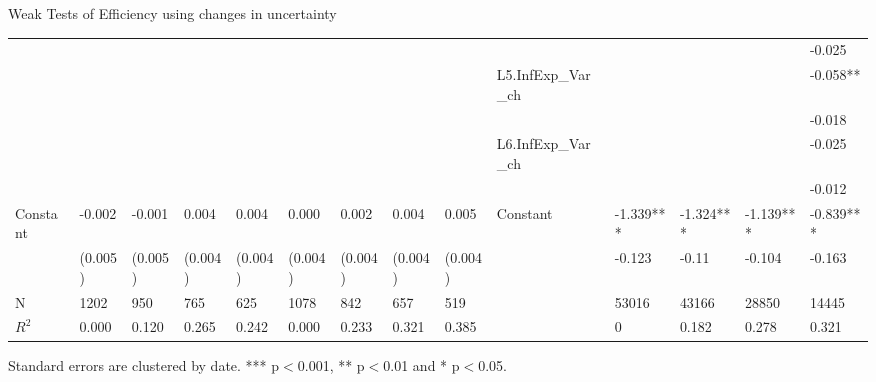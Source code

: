 \documentclass{beamer}
\begin{document}
\begin{frame}{Weak Tests of Efficiency using changes in uncertainty}
\begin{adjustbox}{width=\textwidth}
\begin{threeparttable}
\begin{tabular}{llllllllllllll}
			&             &           &           &           &               &           &           &           &                      &               &           &           & -0.025    \\
			&             &           &           &           &               &           &           &           & L5.InfExp\_Var\_ch   &               &           &           & -0.058**  \\
			&             &           &           &           &               &           &           &           &                      &               &           &           & -0.018    \\
			&             &           &           &           &               &           &           &           & L6.InfExp\_Var\_ch   &               &           &           & -0.025    \\
			&             &           &           &           &               &           &           &           &                      &               &           &           & -0.012    \\
			Constant               & -0.002      & -0.001    & 0.004     & 0.004     & 0.000         & 0.002     & 0.004     & 0.005     &   Constant                   & -1.339***     & -1.324*** & -1.139*** & -0.839*** \\
			& (0.005)     & (0.005)   & (0.004)   & (0.004)   & (0.004)       & (0.004)   & (0.004)   & (0.004)   &                      & -0.123        & -0.11     & -0.104    & -0.163    \\
			\hline 
			N                    & 1202        & 950       & 765       & 625       & 1078          & 842       & 657       & 519       &                      & 53016         & 43166     & 28850     & 14445     \\
			$R^2$ & 0.000       & 0.120     & 0.265     & 0.242     & 0.000         & 0.233     & 0.321     & 0.385     &                      & 0             & 0.182     & 0.278     & 0.321  \\
			\hline    
		\end{tabular}
		\begin{tablenotes}
			\item Standard errors are clustered by date. *** p$<$0.001, ** p$<$0.01 and * p$<$0.05.
		\end{tablenotes}
	\end{threeparttable}
\end{adjustbox}
\end{frame}
\end{document}
